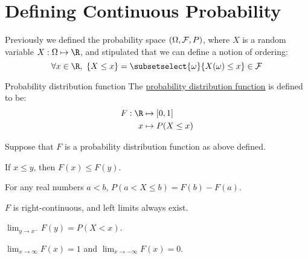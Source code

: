 \documentclass[../Main.tex]{subfiles}
\begin{document}
\section{Defining Continuous Probability}
Previously we defined the probability space $\left(\Omega, \mathcal{F}, P\right)$, where $X$ is a random variable $X : \Omega \mapsto \R$, and stipulated that we can define a notion of ordering:
\begin{equation*}
    \forall x \in \R,~\{X \leq x\} = \subsetselect{\omega}{X(\omega) \leq x} \in \sigalg
\end{equation*}
\begin{definition}{Probability distribution function}
    The \underline{probability distribution function} is defined to be:
    \begin{align*}
        F : \R &\mapsto [0, 1] \\
        x &\mapsto P(X \leq x)
    \end{align*}
\end{definition}
\begin{propositions}{
        Suppose that $F$ is a probability distribution function as above defined.
        \label{propsPDFProps}
    }
    \item If $x \leq y$, then $F(x) \leq F(y)$. \label{propPDFIncreasing}
    \item For any real numbers $a < b$, $P(a < X \leq b) = F(b) - F(a)$. \label{propPDFSubtract}
    \item $F$ is right-continuous, and left limits always exist. \label{propPDFContinuity}
    \item $\lim_{y \to x^-} F(y) = P(X < x)$.\label{propPDFStrictLessThan}
    \item $\lim_{x \to \infty} F(x) = 1$ and $\lim_{x \to -\infty} F(x) = 0$. \label{propPDFLimits}
\end{propositions}
\end{document}

